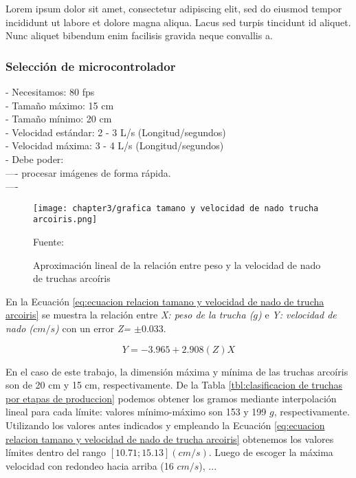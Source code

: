 Lorem ipsum dolor sit amet, consectetur adipiscing elit, sed do eiusmod tempor incididunt ut labore et dolore magna aliqua. Lacus sed turpis tincidunt id aliquet. Nunc aliquet bibendum enim facilisis gravida neque convallis a. 

\subsubsection{Selección de microcontrolador} %


- Necesitamos: 80 fps \\
- Tamaño máximo: 15 cm \\
- Tamaño mínimo: 20 cm \\
- Velocidad estándar: 2 - 3 L/s (Longitud/segundos) \\
- Velocidad máxima: 3 - 4 L/s (Longitud/segundos) \\
- Debe poder: \\
---- procesar imágenes de forma rápida. \\
----  

\begin{figure}[H]
	\centering
	\texttt{[image: chapter3/grafica tamano y velocidad de nado trucha arcoiris.png]}
	\caption{Aproximación lineal de la relación entre peso y la velocidad de nado de truchas arcoíris}
	\begin{myflushleftportland}
		Fuente: \cite{Fry1970}
	\end{myflushleftportland}
	\label{fig:grafica tamano y velocidad de nado trucha arcoiris}
\end{figure}


En la Ecuación \ref{eq:ecuacion relacion tamano y velocidad de nado de trucha arcoiris} se muestra la relación entre \textit{X: peso de la trucha ($g$)} e \textit{Y: velocidad de nado ($cm/s$)} con un error \textit{Z= $\pm 0.033$}. 

\begin{equation} \label{eq:ecuacion relacion tamano y velocidad de nado de trucha arcoiris}
	Y=-3.965+2.908(Z)X
\end{equation}

En el caso de este trabajo, la dimensión máxima y mínima de las truchas arcoíris son de 20 cm y 15 cm, respectivamente. De la Tabla \ref{tbl:clasificacion de truchas por etapas de produccion} podemos obtener los gramos mediante interpolación lineal para cada límite: valores mínimo-máximo son 153 y 199 \textit{$g$}, respectivamente. Utilizando los valores antes indicados y empleando la Ecuación \ref{eq:ecuacion relacion tamano y velocidad de nado de trucha arcoiris} obtenemos los valores límites dentro del rango $[10.71; 15.13] (cm/s)$. Luego de escoger la máxima velocidad con redondeo hacia arriba (16 $cm/s$), ...






